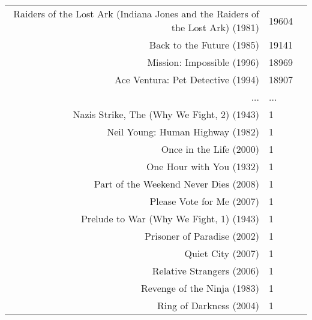 \documentclass[11pt]{article}
\begin{document}
\begin{tabular}{r|ll}
	 Raiders of the Lost Ark (Indiana Jones and the Raiders of the Lost Ark) (1981) & 19604                                                                         \\
	 Back to the Future (1985)                                                      & 19141                                                                         \\
	 Mission: Impossible (1996)                                                     & 18969                                                                         \\
	 Ace Ventura: Pet Detective (1994)                                              & 18907                                                                         \\
	 ... & ...\\
	 Nazis Strike, The (Why We Fight, 2) (1943)            & 1                                                    \\
	 Neil Young: Human Highway (1982)                      & 1                                                    \\
	 Once in the Life (2000)                               & 1                                                    \\
	 One Hour with You (1932)                              & 1                                                    \\
	 Part of the Weekend Never Dies (2008)                 & 1                                                    \\
	 Please Vote for Me (2007)                             & 1                                                    \\
	 Prelude to War (Why We Fight, 1) (1943)               & 1                                                    \\
	 Prisoner of Paradise (2002)                           & 1                                                    \\
	 Quiet City (2007)                                     & 1                                                    \\
	 Relative Strangers (2006)                             & 1                                                    \\
	 Revenge of the Ninja (1983)                           & 1                                                    \\
	 Ring of Darkness (2004)                               & 1                                                    \\

\end{tabular}
\end{document}
